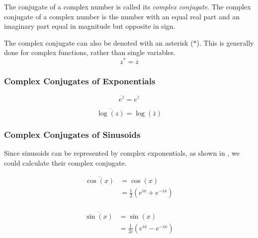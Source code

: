 \begin{definition}
  The conjugate of a complex number is called its \emph{complex conjugate}.
  The complex conjugate of a complex number is the number with an equal real part and an imaginary part equal in magnitude but opposite in sign.
\end{definition}

The complex conjugate can also be denoted with an asterisk ($*$).
This is generally done for complex functions, rather than single variables.
\begin{equation}\label{eq:Complex_Conjugates_Asterisk}
  z^{*} = \overline{z}
\end{equation}

\subsubsection{Complex Conjugates of Exponentials}\label{app:Exponential_Complex_Conjugates}
\begin{equation}\label{eq:Exponential_Complex_Conjugates-e}
  \overline{e^{z}} = e^{\overline{z}}
\end{equation}

\begin{equation}\label{eq:Exponential_Complex_Conjugates-log}
  \overline{\log(z)} = \log(\overline{z})
\end{equation}

\subsubsection{Complex Conjugates of Sinusoids}\label{app:Sinusoid_Complex_Conjugates}
Since sinusoids can be represented by complex exponentials, as shown in , we could calculate their complex conjugate.

\begin{equation}\label{eq:Sinusoid_Complex_Conjugate-Cosine}
  \begin{aligned}
    \overline{\cos(x)} &= \cos(x) \\
    &= \frac{1}{2} \left( e^{ix} + e^{-ix} \right) \\
  \end{aligned}
\end{equation}

\begin{equation}\label{eq:Sinusoid_Complex_Conjugate-Sine}
  \begin{aligned}
    \overline{\sin(x)} &= \sin(x) \\
    &= \frac{1}{2i} \left( e^{ix} - e^{-ix} \right) \\
  \end{aligned}
\end{equation}

